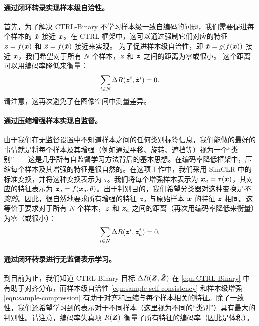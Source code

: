 \documentclass[../../book-main.tex]{subfiles}
\begin{document}
\paragraph{通过闭环转录实现样本级自洽性。} 
首先，为了解决 CTRL-Binary 不学习样本级一致自编码的问题，我们需要促进每个样本的 $\hat {\bm{x}}$ 接近 $\bm{x}$。在 CTRL 框架中，这可以通过强制它们对应的特征 $\bm{z}=f(\bm{x})$ 和 $\hat {\bm{z}} = f(\hat {\bm{x}})$ 接近来实现。
为了促进样本级自洽性，即 $\hat{\bm{x}} = g(f(\bm{x}))$ 接近 $\bm{x}$，我们希望对于所有 $N$ 个样本，$\bm{z}$ 和 $\hat{\bm{z}}$ 之间的距离为零或很小。
这个距离可以用编码率降低来衡量：
\begin{align}
\sum_{i\in N} \Delta R(\z^i,\hat{\z}^i) = 0.
\label{eqn:sample-self-consistency}\vspace{-2mm}
\end{align}
请注意，这再次避免了在图像空间中测量差异。

\paragraph{通过压缩增强样本实现自监督。} 
由于我们在无监督设置中不知道样本之间的任何类别标签信息，我们能做的最好的事情就是将每个样本及其增强（例如通过平移、旋转、遮挡等）视为一个“类别”——这是几乎所有自监督学习方法背后的基本思想。在编码率降低框架中，压缩每个样本及其增强的特征是很自然的。在这项工作中，我们采用 SimCLR \cite{chen2020simple} 中的标准变换，并将这种变换表示为 $\tau$。我们将每个增强样本表示为 $\bm{x}_a = \tau(\bm{x})$，其对应的特征表示为 $\bm{z}_a = f(\bm{x}_a, \theta)$。出于判别目的，我们希望分类器对这种变换是{\em 不变的}。因此，很自然地要求所有增强的特征 $\bm{z}_a$ 与原始样本 $\bm{x}$ 的特征 $\bm{z}$ 相同。这等价于要求对于所有 $N$ 个样本，$\bm{z}$ 和 $\bm{z}_a$ 之间的距离（再次用编码率降低来衡量）为零（或很小）：
\begin{align}
\sum_{i\in N} \Delta R(\z^i,\z_{a}^i) = 0.
\label{eqn:sample-compression}\vspace{-3mm}
\end{align}


\paragraph{通过闭环转录进行无监督表示学习。} 
到目前为止，我们知道 CTRL-Binary 目标 $\Delta R(\bm{Z}, \hat{\bm{Z}})$ 在 \eqref{eqn:CTRL-Binary} 中有助于对齐分布，而样本级自洽性 \eqref{eqn:sample-self-consistency} 和样本级增强 \eqref{eqn:sample-compression} 有助于对齐和压缩与每个样本相关的特征。除了一致性，我们还希望学习到的表示对于不同样本（这里视为不同的“类别”）具有最大的判别性。请注意，编码率失真项 $R(\bm{Z})$ 衡量了所有特征的编码率（因此是体积）。%
\end{document}
